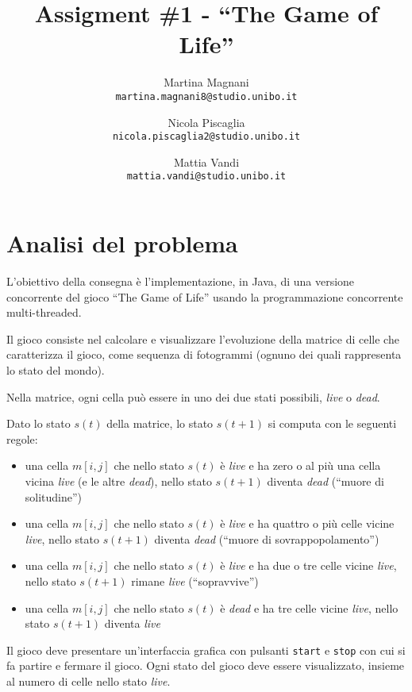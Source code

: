 \documentclass[a4paper]{article}
\title{\LARGE \bf
Assigment \#1 - ``The Game of Life''
}
\author{
    Martina Magnani\\
    \texttt{martina.magnani8@studio.unibo.it}
    \and
    Nicola Piscaglia\\
    \texttt{nicola.piscaglia2@studio.unibo.it}
    \and
    Mattia Vandi\\
    \texttt{mattia.vandi@studio.unibo.it}
}
\date{}
\begin{document}
\maketitle
\section{Analisi del problema}\label{analisi-del-problema}

L'obiettivo della consegna è l'implementazione, in Java, di una versione concorrente del gioco ``The Game of Life'' usando la programmazione concorrente multi-threaded.

Il gioco consiste nel calcolare e visualizzare l'evoluzione della
matrice di celle che caratterizza il gioco, come sequenza di fotogrammi (ognuno dei quali rappresenta lo stato del mondo).

Nella matrice, ogni cella può essere in uno dei due stati possibili, \emph{live} o \emph{dead}.

Dato lo stato \(s\left(t\right)\) della matrice, lo stato \(s\left(t + 1\right)\) si computa con le seguenti regole:

\begin{itemize}
\item
  una cella \(m\left[i,j\right]\) che nello stato \(s\left(t\right)\) è \emph{live} e ha zero o al più una cella vicina \emph{live} (e le altre \emph{dead}), nello stato \(s\left(t + 1\right)\) diventa \emph{dead} (``muore di solitudine'')
\item
  una cella \(m\left[i,j\right]\) che nello stato \(s\left(t\right)\) è \emph{live} e ha quattro o più celle vicine \emph{live}, nello stato \(s\left(t + 1\right)\) diventa \emph{dead} (``muore di sovrappopolamento'')
\item
  una cella \(m\left[i,j\right]\) che nello stato \(s\left(t\right)\) è \emph{live} e ha due o tre celle vicine \emph{live}, nello stato \(s\left(t + 1\right)\) rimane \emph{live} (``sopravvive'')
\item
  una cella \(m\left[i,j\right]\) che nello stato \(s\left(t\right)\) è \emph{dead} e ha tre celle vicine \emph{live}, nello stato \(s\left(t + 1\right)\) diventa \emph{live}
\end{itemize}

Il gioco deve presentare un'interfaccia grafica con pulsanti \texttt{start} e \texttt{stop} con cui si fa partire e fermare il gioco.
Ogni stato del gioco deve essere visualizzato, insieme al numero di celle nello stato \emph{live}.
\end{document}
